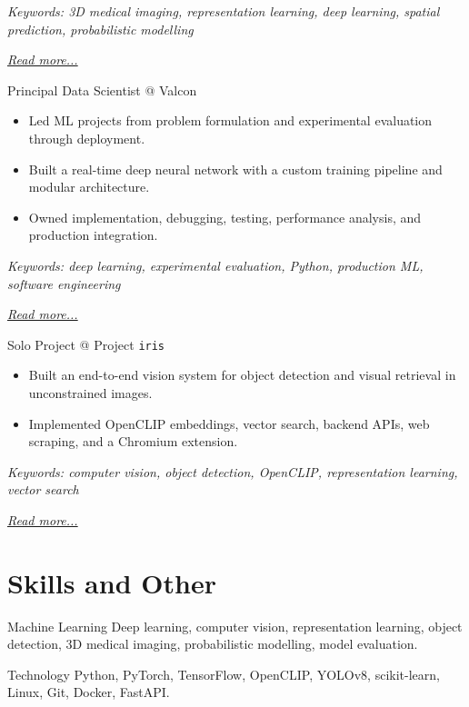 \documentclass[11pt,a4paper]{moderncv}
\begin{document}
{\footnotesize\textit{Keywords: 3D medical imaging, representation learning, deep learning, spatial prediction, probabilistic modelling}}

\hfill{\small{\textit{\hyperref[sec:raysearch]{Read more...}}}}

\large{Principal Data Scientist @ Valcon}
\normalsize
\begin{itemize}
    \item Led ML projects from problem formulation and experimental evaluation through deployment.
    \item Built a real-time deep neural network with a custom training pipeline and modular architecture.
    \item Owned implementation, debugging, testing, performance analysis, and production integration.
\end{itemize}

{\footnotesize\textit{Keywords: deep learning, experimental evaluation, Python, production ML, software engineering}}

\hfill{\small{\textit{\hyperref[sec:valcon]{Read more...}}}}

\large{Solo Project @ Project \texttt{iris}}
\normalsize
\begin{itemize}
    \item Built an end-to-end vision system for object detection and visual retrieval in unconstrained images.
    \item Implemented OpenCLIP embeddings, vector search, backend APIs, web scraping, and a Chromium extension.
\end{itemize}

{\footnotesize\textit{Keywords: computer vision, object detection, OpenCLIP, representation learning, vector search}}

\hfill{\small{\textit{\hyperref[sec:iris]{Read more...}}}}

\section{Skills and Other}

\cvitem
{Machine Learning}
{Deep learning, computer vision, representation learning, object detection, 3D medical imaging, probabilistic modelling, model evaluation.}

\cvitem
{Technology}
{Python, PyTorch, TensorFlow, OpenCLIP, YOLOv8, scikit-learn, Linux, Git, Docker, FastAPI.}
\end{document}
